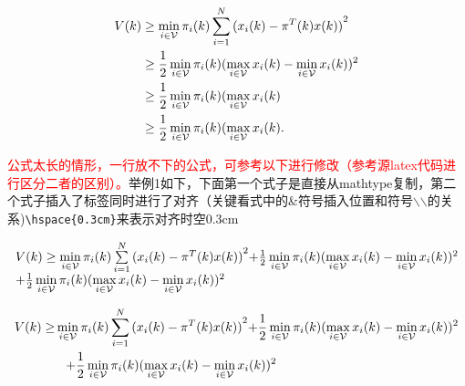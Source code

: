 \documentclass[master]{styles/hdu-thesis}
\begin{document}
\begin{equation}\label{system2}
\begin{split}
V(k) &\ge \mathop {\min }\limits_{i \in {\cal V}} {\pi _i}(k)\sum\limits_{i = 1}^N {{{({x_i}(k) - {\pi ^T}(k)x(k))}^2}} \\
 &\ge \frac{1}{2}\mathop {\min }\limits_{i \in {\cal V}} {\pi _i}(k){(\mathop {\max }\limits_{i \in {\cal V}} {x_i}(k) - \mathop {\min }\limits_{i \in {\cal V}} {x_i}(k))^2}\\
 &\ge \frac{1}{2}\mathop {\min }\limits_{i \in {\cal V}} {\pi _i}(k)(\mathop {\max }\limits_{i \in {\cal V}} {x_i}(k)\\
 &\ge \frac{1}{2}\mathop {\min }\limits_{i \in {\cal V}} {\pi _i}(k)(\mathop {\max }\limits_{i \in {\cal V}} {x_i}(k).
\end{split}
\end{equation}

\textcolor{red}{公式太长的情形，一行放不下的公式，可参考以下进行修改（参考源latex代码进行区分二者的区别）。}举例1如下，下面第一个式子是直接从mathtype复制，第二个式子插入了标签同时进行了对齐（关键看式中的\&符号插入位置和符号$\backslash$$\backslash$的关系)\verb+\hspace{0.3cm}+来表示对齐时空0.3cm


\[\begin{array}{l}
V(k) \ge \mathop {\min }\limits_{i \in {\cal V}} {\pi _i}(k)\sum\limits_{i = 1}^N {{{({x_i}(k) - {\pi ^T}(k)x(k))}^2}} {\rm{ + }}\frac{1}{2}\mathop {\min }\limits_{i \in {\cal V}} {\pi _i}(k){(\mathop {\max }\limits_{i \in {\cal V}} {x_i}(k) - \mathop {\min }\limits_{i \in {\cal V}} {x_i}(k))^2}\\
{\rm{ + }}\frac{1}{2}\mathop {\min }\limits_{i \in {\cal V}} {\pi _i}(k){(\mathop {\max }\limits_{i \in {\cal V}} {x_i}(k) - \mathop {\min }\limits_{i \in {\cal V}} {x_i}(k))^2}
\end{array}\]

\begin{equation}\label{system3}
  \begin{split}
V(k) \ge& \mathop {\min }\limits_{i \in {\cal V}} {\pi _i}(k)\sum\limits_{i = 1}^N {{{({x_i}(k) - {\pi ^T}(k)x(k))}^2}} {\rm{ + }}\frac{1}{2}\mathop {\min }\limits_{i \in {\cal V}} {\pi _i}(k){(\mathop {\max }\limits_{i \in {\cal V}} {x_i}(k) - \mathop {\min }\limits_{i \in {\cal V}} {x_i}(k))^2}\\
&\hspace{0.3cm}{\rm{ + }}\frac{1}{2}\mathop {\min }\limits_{i \in {\cal V}} {\pi _i}(k){(\mathop {\max }\limits_{i \in {\cal V}} {x_i}(k) - \mathop {\min }\limits_{i \in {\cal V}} {x_i}(k))^2}
  \end{split}
\end{equation}
\end{document}
